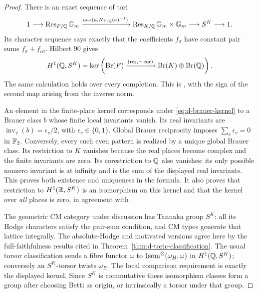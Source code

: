 \begin{proof}
There is an exact sequence of tori
\begin{equation}
 1\longrightarrow\operatorname{Res}_{F/\mathbb Q}{\mathbb G_m}
 \xrightarrow{a\mapsto(a,N_{F/\mathbb Q}(a)^{-1})}
 \operatorname{Res}_{K/\mathbb Q}{\mathbb G_m}\times{\mathbb G_m}
 \longrightarrow S^K\longrightarrow1.
 \label{eq:d-serre-resolution}
\end{equation}
Its character sequence says exactly that the coefficients $f_\sigma$
have constant pair sums $f_\sigma+f_{c\sigma}$.  Hilbert 90 gives
\begin{equation}
 H^1(\mathbb Q,S^K)=
 \ker\left(\operatorname{Br}(F)\xrightarrow{(\operatorname{res},-\operatorname{cor})}
                         \operatorname{Br}(K)\oplus\operatorname{Br}(\mathbb Q)\right).
 \label{eq:d-brauer-kernel}
\end{equation}
The same calculation holds over every completion.  This is
\citet[Equation (23) and Lemma 3.1]{AMilne2003}, with the sign
of the second map arising from the inverse norm.

An element in the finite-place kernel corresponds under
\eqref{eq:d-brauer-kernel} to a Brauer class $b$ whose finite local
invariants vanish.  Its real invariants are
$\operatorname{inv}_v(b)=\epsilon_v/2$, with
$\epsilon_v\in\{0,1\}$.  Global Brauer reciprocity imposes
$\sum_v\epsilon_v=0$ in $\mathbb F_2$.  Conversely, every such even
pattern is realized by a unique global Brauer class.  Its restriction
to $K$ vanishes because the real places become complex and the
finite invariants are zero.  Its corestriction to $\mathbb Q$ also vanishes:
its only possible nonzero invariant is at infinity and is the sum
of the displayed real invariants.  This proves both existence and
uniqueness in the formula.  It also proves that restriction to
$H^1(\mathbb R,S^K)$ is an isomorphism on this kernel and that the kernel
over \emph{all} places is zero, in agreement with
\citet[Proposition 3.2]{AMilne2003}.

The geometric CM category under discussion has Tannaka group $S^K$:
all its Hodge characters satisfy the pair-sum condition, and CM
types generate that lattice integrally.  The absolute-Hodge and
motivated versions agree here by the full-faithfulness results cited
in Theorem~\ref{thm:d-toric-classification}.  The usual torsor
classification sends a fibre functor $\omega$ to
$\operatorname{Isom}^\otimes(\omega_B,\omega)$ in $H^1(\mathbb Q,S^K)$; conversely an
$S^K$-torsor twists $\omega_B$.  The local comparison requirement
is exactly the displayed kernel.  Since $S^K$ is commutative these
isomorphism classes form a group after choosing Betti as origin,
or intrinsically a torsor under that group.
\end{proof}

